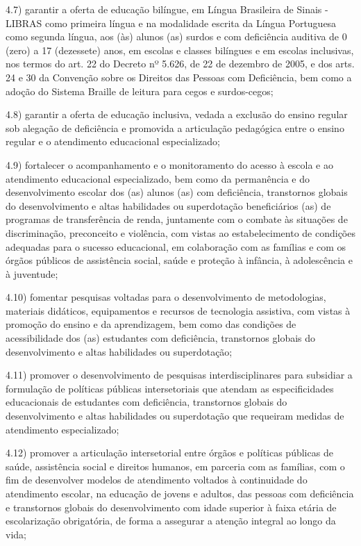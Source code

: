 \documentclass[
]{book}
\begin{document}
4.7) garantir a oferta de educação bilíngue, em Língua Brasileira de Sinais - LIBRAS como primeira língua e na modalidade escrita da Língua Portuguesa como segunda língua, aos (às) alunos (as) surdos e com deficiência auditiva de 0 (zero) a 17 (dezessete) anos, em escolas e classes bilíngues e em escolas inclusivas, nos termos do art. 22 do Decreto nº 5.626, de 22 de dezembro de 2005, e dos arts. 24 e 30 da Convenção sobre os Direitos das Pessoas com Deficiência, bem como a adoção do Sistema Braille de leitura para cegos e surdos-cegos;

4.8) garantir a oferta de educação inclusiva, vedada a exclusão do ensino regular sob alegação de deficiência e promovida a articulação pedagógica entre o ensino regular e o atendimento educacional especializado;

4.9) fortalecer o acompanhamento e o monitoramento do acesso à escola e ao atendimento educacional especializado, bem como da permanência e do desenvolvimento escolar dos (as) alunos (as) com deficiência, transtornos globais do desenvolvimento e altas habilidades ou superdotação beneficiários (as) de programas de transferência de renda, juntamente com o combate às situações de discriminação, preconceito e violência, com vistas ao estabelecimento de condições adequadas para o sucesso educacional, em colaboração com as famílias e com os órgãos públicos de assistência social, saúde e proteção à infância, à adolescência e à juventude;

4.10) fomentar pesquisas voltadas para o desenvolvimento de metodologias, materiais didáticos, equipamentos e recursos de tecnologia assistiva, com vistas à promoção do ensino e da aprendizagem, bem como das condições de acessibilidade dos (as) estudantes com deficiência, transtornos globais do desenvolvimento e altas habilidades ou superdotação;

4.11) promover o desenvolvimento de pesquisas interdisciplinares para subsidiar a formulação de políticas públicas intersetoriais que atendam as especificidades educacionais de estudantes com deficiência, transtornos globais do desenvolvimento e altas habilidades ou superdotação que requeiram medidas de atendimento especializado;

4.12) promover a articulação intersetorial entre órgãos e políticas públicas de saúde, assistência social e direitos humanos, em parceria com as famílias, com o fim de desenvolver modelos de atendimento voltados à continuidade do atendimento escolar, na educação de jovens e adultos, das pessoas com deficiência e transtornos globais do desenvolvimento com idade superior à faixa etária de escolarização obrigatória, de forma a assegurar a atenção integral ao longo da vida;
\end{document}
